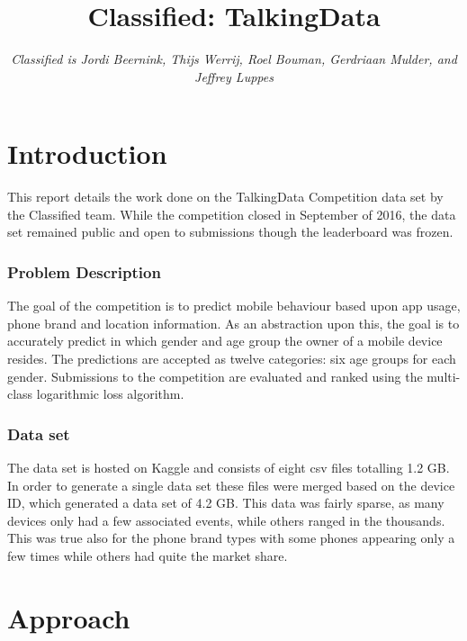 \documentclass[runningheads,a4paper]{llncs}
\begin{document}
\mainmatter 

\title{Classified: TalkingData}


\author{\textit{Classified is Jordi Beernink, Thijs Werrij, Roel Bouman, Gerdriaan Mulder, and Jeffrey Luppes}}



\tocauthor{{}}

\maketitle
\section{Introduction}
\noindent
This report details the work done on the TalkingData Competition data set by the Classified team. While the competition closed in September of 2016, the data set remained public and open to submissions though the leaderboard was frozen.

\subsubsection{Problem Description}
The goal of the competition is to predict mobile behaviour based upon app usage, phone brand and location information. As an abstraction upon this, the goal is to accurately predict in which gender and age group the owner of a mobile device resides. The predictions are accepted as twelve categories: six age groups for each gender. Submissions to the competition are evaluated and ranked using the multi-class logarithmic loss algorithm.
\subsubsection{Data set}
The data set is hosted on Kaggle and consists of eight csv files totalling 1.2 GB. In order to generate a single data set these files were merged based on the device ID, which generated a data set of 4.2 GB. This data was fairly sparse, as many devices only had a few associated events, while others ranged in the thousands. This was true also for the phone brand types with some phones appearing only a few times while others had quite the market share. 

\section{Approach}
\end{document}

